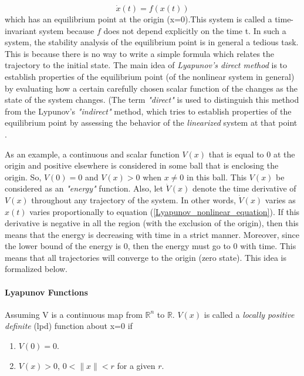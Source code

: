 \documentclass{thesisreport}
\begin{document}
\begin{equation} \label{Lyapunov_nonlinear_equation}
\dot{x}(t) = f(x(t))
\end{equation}
which has an equilibrium point at the origin (x=0).This system is called a time-invariant system because $f$ does not depend explicitly on the time t. In such a system, the stability analysis of the equilibrium point is in general a tedious task. This is because there is no way to write a simple formula which relates the trajectory to the initial state. The main idea of \textit{Lyapunov's direct method} is to establish properties of the equilibrium point (of the nonlinear system in general) by evaluating how a certain carefully chosen scalar function of the changes as the state of the system changes. (The term \textit{"direct"} is used to distinguish this method from the Lypunov's \textit{"indirect"} method, which tries to establish properties of the equilibrium point by assessing the behavior of the \textit{linearized} system at that point \cite{MELCHORAGUILAR2004175}.

As an example, a continuous and scalar function $V(x)$ that is equal to 0 at the origin and positive elsewhere is considered in some ball that is enclosing the origin. So, $V(0)=0$ and $V(x)>0$ when $x \neq 0$ in this ball. This $V(x)$ be considered as an \textit{"energy"} function. Also, let $\dot{V}(x)$ denote the time derivative of $V(x)$ throughout any trajectory of the system. In other words,  $\dot{V}(x)$ varies as $x(t)$ varies proportionally to equation (\ref{Lyapunov_nonlinear_equation}). If this derivative is negative in all the region (with the exclusion of the origin), then this means that the energy is decreasing with time in a strict manner. Moreover, since the lower bound of the energy is 0, then the energy must go to 0 with time. This means that all trajectories will converge to the origin (zero state). This idea is formalized below.




\newpage

\paragraph{Lyapunov Functions}

Assuming V is a continuous map from $\mathbb{R}^n$ to $\mathbb{R}$. $V(x)$ is called a \textit{locally positive definite} (lpd) function about x=0 if 

\begin{enumerate}
	\item $V(0)=0$.
	\item $V(x)>0$, $0<\|x\|<r$ for a given $r$.
\end{enumerate}
\end{document}
